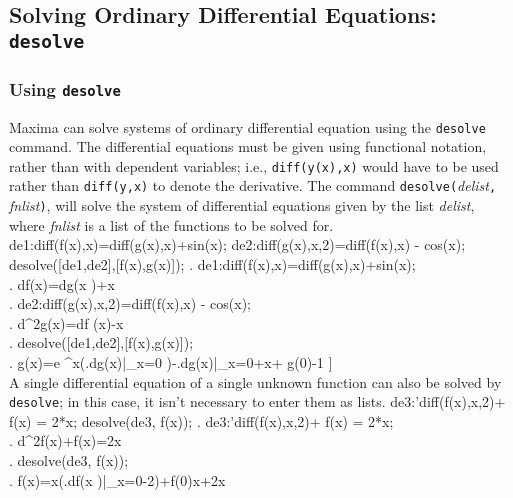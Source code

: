 \documentclass{article}
\begin{document}
\subsection{Solving Ordinary Differential Equations: \texttt{desolve}}
\label{subsec:desolve}

\subsubsection{Using \texttt{desolve}}

Maxima can solve systems of ordinary differential equation using the 
\texttt{desolve} command. The differential
equations must be given using functional notation, rather than with
dependent variables; i.e., \texttt{diff(y(x),x)} would have to be used
rather than \texttt{diff(y,x)} to denote the derivative.  
The command 
\texttt{desolve(}\textit{delist}\texttt{, }\textit{fnlist}\texttt{)},
will solve the system of differential equations given by the list
\textit{delist}, where \textit{fnlist} is a list of the functions to
be solved for.
\beginmaximasession
de1:diff(f(x),x)=diff(g(x),x)+sin(x);
de2:diff(g(x),x,2)=diff(f(x),x) - cos(x);
desolve([de1,de2],[f(x),g(x)]);
\maximatexsession
{}.  de1:diff(f(x),x)=diff(g(x),x)+sin(x); \\
.   {{d}}\*f\left(x\right)={{d}}\*g\left(x
 \right)+\sin x \\
.  de2:diff(g(x),x,2)=diff(f(x),x) - cos(x); \\
.   {{d^{2}}}\*g\left(x\right)={{d}}\*f
 \left(x\right)-\cos x \\
.  desolve([de1,de2],[f(x),g(x)]); \\
.   \left[ f\left(x\right)=e^{x}\*\left(\left.{{d}\over{d\*x}}\*g
 \left(x\right)\right|_{x=0}\right)-\left.{{d}\over{d\*x}}\*g\left(x
 \right)\right|_{x=0}+f\left(0\right),\linebreak[0]g\left(x\right)=e
 ^{x}\*\left(\left.{{d}}\*g\left(x\right)\right|_{x=0}
 \right)-\left.{{d}}\*g\left(x\right)\right|_{x=0}+\cos x+
 g\left(0\right)-1 \right]  \\
\endmaximasession
\noindent
A single differential equation of a single unknown function can also
be solved by \texttt{desolve}; in this case, it isn't  
necessary to enter them as lists.
\beginmaximasession
de3:'diff(f(x),x,2)+ f(x) = 2*x;
desolve(de3, f(x));
\maximatexsession
{}.  de3:'diff(f(x),x,2)+ f(x) = 2*x; \\
.   {{d^{2}}}\*f\left(x\right)+f\left(x\right)=2\*x \\
.  desolve(de3, f(x)); \\
.   f\left(x\right)=\sin x\*\left(\left.{{d}}\*f\left(x
 \right)\right|_{x=0}-2\right)+f\left(0\right)\*\cos x+2\*x \\
\endmaximasession
\end{document}
